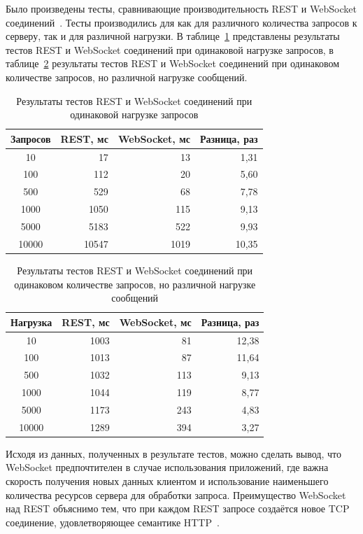 Было произведены тесты, сравнивающие производительность REST и WebSocket соединений~\cite{http_websockets}. Тесты производились для как для различного количества запросов к серверу, так и для различной нагрузки. В таблице~\ref{tab:constant_payload} представлены результаты тестов REST и WebSocket соединений при одинаковой нагрузке запросов, в таблице~\ref{tab:increasing_payload} результаты тестов REST и WebSocket соединений при одинаковом количестве запросов, но различной нагрузке сообщений.

\begin{table}[H]
  \caption{Результаты тестов REST и WebSocket соединений при одинаковой нагрузке запросов}
  \label{tab:constant_payload}
  \begin{tabular}{|c|r|r|r|}
  \hline
  \textbf{Запросов} & \textbf{REST, мс} & \textbf{WebSocket, мс} & \textbf{Разница, раз} \\ \hline
  10    & 17    & 13   & 1,31  \\ \hline
  100   & 112   & 20   & 5,60  \\ \hline
  500   & 529   & 68   & 7,78  \\ \hline
  1000  & 1050  & 115  & 9,13  \\ \hline
  5000  & 5183  & 522  & 9,93  \\ \hline
  10000 & 10547 & 1019 & 10,35 \\ \hline
  \end{tabular}
\end{table}

\begin{table}[H]
  \caption{Результаты тестов REST и WebSocket соединений при одинаковом количестве запросов, но различной нагрузке сообщений}
  \label{tab:increasing_payload}
  \begin{tabular}{|c|r|r|r|}
  \hline
  \textbf{Нагрузка} & \textbf{REST, мс} & \textbf{WebSocket, мс} & \textbf{Разница, раз} \\ \hline
  10    & 1003 & 81  & 12,38 \\ \hline
  100   & 1013 & 87  & 11,64 \\ \hline
  500   & 1032 & 113 & 9,13  \\ \hline
  1000  & 1044 & 119 & 8,77  \\ \hline
  5000  & 1173 & 243 & 4,83  \\ \hline
  10000 & 1289 & 394 & 3,27  \\ \hline
  \end{tabular}
\end{table}

Исходя из данных, полученных в результате тестов, можно сделать вывод, что WebSocket предпочтителен в случае использования приложений, где важна скорость получения новых данных клиентом и использование наименьшего количества ресурсов сервера для обработки запроса. Преимущество WebSocket над REST объяснимо тем, что при каждом REST запросе создаётся новое TCP соединение, удовлетворяющее семантике HTTP~\cite{http_websockets}.
